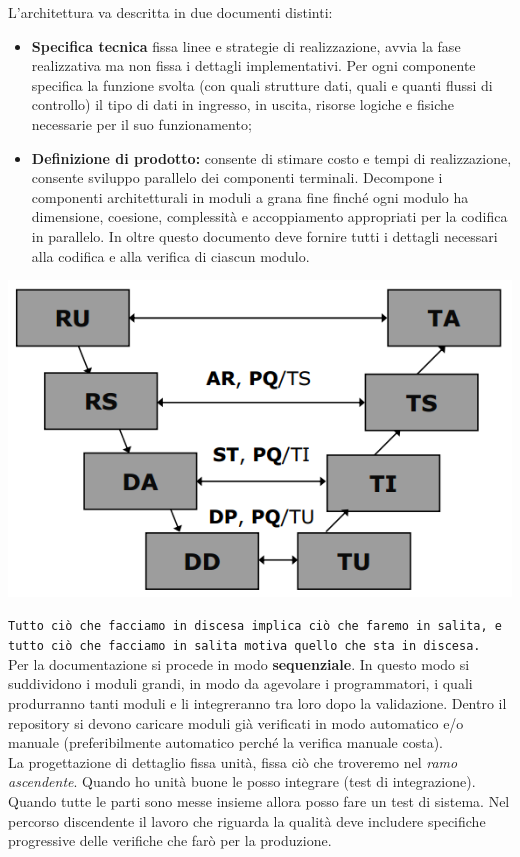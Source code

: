 L'architettura va descritta in due documenti distinti:

\begin{itemize}

	\item \textbf{Specifica tecnica} fissa linee e strategie di realizzazione, avvia la fase realizzativa ma non fissa i dettagli implementativi. Per ogni componente specifica la funzione svolta (con quali strutture dati, quali e quanti flussi di controllo) il tipo di dati in ingresso, in uscita, risorse logiche e fisiche necessarie per il suo funzionamento;
	\item \textbf{Definizione di prodotto:} consente di stimare costo e tempi di realizzazione,  consente sviluppo parallelo dei componenti terminali. Decompone i componenti architetturali in moduli a grana fine finché ogni modulo ha dimensione, coesione, complessità e accoppiamento appropriati per la codifica in parallelo. In oltre questo documento deve fornire tutti i dettagli necessari alla codifica e alla verifica di ciascun modulo.

\end{itemize}

\begin{center}
\includegraphics[width=0.4\columnwidth]{img1}
\end{center}
\texttt{Tutto ciò che facciamo in discesa implica ciò che faremo in salita, e tutto ciò che facciamo in salita motiva quello che sta in discesa.} \\
Per la documentazione si procede in modo \textbf{sequenziale}. In questo modo si suddividono i moduli grandi, in modo da agevolare i programmatori, i quali produrranno tanti moduli e li integreranno tra loro dopo la validazione. Dentro il repository si devono caricare moduli già verificati in modo automatico e/o manuale (preferibilmente automatico perché la verifica manuale costa).\\
La progettazione di dettaglio fissa unità, fissa ciò che troveremo nel \textit{ramo ascendente}. Quando ho unità buone le posso integrare (test di integrazione). Quando tutte le parti sono messe insieme allora posso fare un test di sistema. Nel percorso discendente il lavoro che riguarda la qualità deve includere specifiche progressive delle verifiche che farò per la produzione.\\

